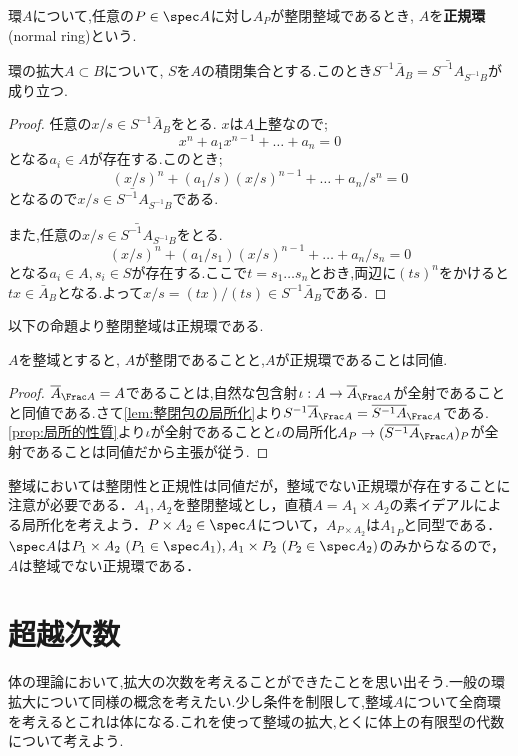\begin{defi}[正規環]
	環$A$について,任意の$P\in\spec A$に対し$A_P$が整閉整域であるとき, $A$を\textbf{正規環}(normal ring)という.
\end{defi}

\begin{lem}\label{lem:整閉包の局所化}
	環の拡大$A\subset B$について, $S$を$A$の積閉集合とする.このとき$S^{-1}\bar{A}_B=\bar{S^{-1}A}_{S^{-1}B}$が成り立つ.
\end{lem}

\begin{proof}
	任意の$x/s\in S^{-1}\bar{A}_B$をとる. $x$は$A$上整なので;
	\[x^n+a_1x^{n-1}+\dots+a_n=0\]
	となる$a_i\in A$が存在する.このとき;
	\[(x/s)^n+(a_1/s)(x/s)^{n-1}+\dots+a_n/s^n=0\]
	となるので$x/s\in\bar{S^{-1}A}_{S^{-1}B}$である.
	
	また,任意の$x/s\in\bar{S^{-1}A}_{S^{-1}B}$をとる.
	\[(x/s)^n+(a_1/s_1)(x/s)^{n-1}+\dots+a_n/s_n=0\]
	となる$a_i\in A,s_i\in S$が存在する.ここで$t=s_1\dots s_n$とおき,両辺に$(ts)^n$をかけると$tx\in\bar{A}_B$となる.よって$x/s=(tx)/(ts)\in S^{-1}\bar{A}_B$である.
\end{proof}

以下の命題より整閉整域は正規環である.
\begin{prop}\label{prop:整域の整閉性はlocal}
	$A$を整域とすると, $A$が整閉であることと,$A$が正規環であることは同値.
\end{prop}

\begin{proof}
	$\bar{A}_{\Frac A}=A$であることは,自然な包含射$\iota:A\to \bar{A}_{\Frac A}$が全射であることと同値である.さて\ref{lem:整閉包の局所化}より$S^{-1}\bar{A}_{\Frac A}=\bar{S^{-1}A}_{\Frac A}$である.\ref{prop:局所的性質}より$\iota$が全射であることと$\iota$の局所化$A_P\to (\bar{S^{-1}A}_{\Frac A})_P$が全射であることは同値だから主張が従う.
\end{proof}

整域においては整閉性と正規性は同値だが，整域でない正規環が存在することに注意が必要である．$A_1,A_2$を整閉整域とし，直積$A=A_1\times A_2$の素イデアルによる局所化を考えよう．$P\times A_2\in\spec A$について，$A_{P\times A_2}$は${A_1}_{P}$と同型である．$\spec A$は$P_1\times A_2~(P_1\in\spec A_1), A_1\times P_2~(P_2\in\spec A_2)$のみからなるので，$A$は整域でない正規環である．\TODO[正規環は有限この整閉整域の直積らしいよ]

\section{超越次数}
体の理論において,拡大の次数を考えることができたことを思い出そう.一般の環拡大について同様の概念を考えたい.少し条件を制限して,整域$A$について全商環を考えるとこれは体になる.これを使って整域の拡大,とくに体上の有限型の代数について考えよう.

